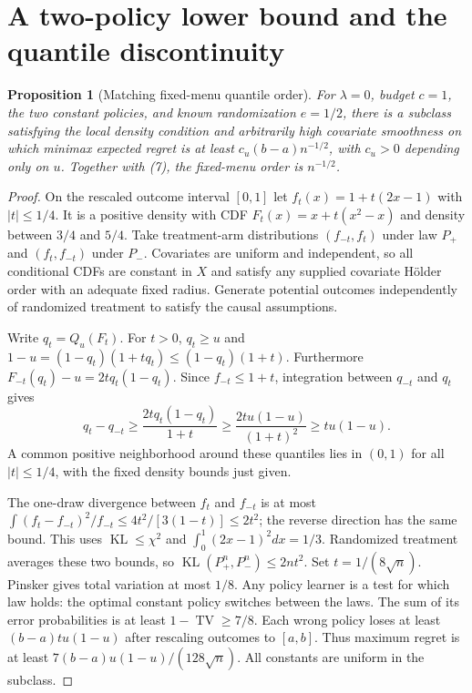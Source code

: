 \documentclass[11pt]{article}
\newtheorem{proposition}[theorem]{Proposition}
\theoremstyle{remark}
\newcommand{\TV}{\operatorname{TV}}
\newcommand{\KL}{\operatorname{KL}}
\begin{document}
\section{A two-policy lower bound and the quantile discontinuity}
\begin{proposition}[Matching fixed-menu quantile order]
For $\lambda=0$, budget $c=1$, the two constant policies, and known
randomization $e=1/2$, there is a subclass satisfying the local density
condition and arbitrarily high covariate smoothness on which minimax
expected regret is at least $c_u(b-a)n^{-1/2}$, with $c_u>0$ depending
only on $u$. Together with (7), the fixed-menu order is $n^{-1/2}$.
\end{proposition}
\begin{proof}
On the rescaled outcome interval $[0,1]$ let
$f_t(x)=1+t(2x-1)$ with $|t|\leq1/4$. It is a positive density with
CDF $F_t(x)=x+t(x^2-x)$ and density between $3/4$ and $5/4$.
Take treatment-arm distributions $(f_{-t},f_t)$ under law $P_+$ and
$(f_t,f_{-t})$ under $P_-$. Covariates are uniform and independent,
so all conditional CDFs are constant in $X$ and satisfy any supplied
covariate H\"older order with an adequate fixed radius. Generate potential
outcomes independently of randomized treatment to satisfy the causal
assumptions.

Write $q_t=Q_u(F_t)$. For $t>0$, $q_t\geq u$ and
$1-u=(1-q_t)(1+tq_t)\leq(1-q_t)(1+t)$.
Furthermore $F_{-t}(q_t)-u=2tq_t(1-q_t)$.
Since $f_{-t}\leq1+t$, integration between $q_{-t}$ and $q_t$ gives
\[
 q_t-q_{-t}\geq\frac{2tq_t(1-q_t)}{1+t}
 \geq\frac{2tu(1-u)}{(1+t)^2}\geq t u(1-u).
\]
A common positive neighborhood around these quantiles lies in $(0,1)$
for all $|t|\leq1/4$, with the fixed density bounds just given.

The one-draw divergence between $f_t$ and $f_{-t}$ is at most
$\int (f_t-f_{-t})^2/f_{-t}\leq4t^2/[3(1-t)]\leq2t^2$;
the reverse direction has the same bound. This uses $\KL\leq\chi^2$
and $\int_0^1(2x-1)^2dx=1/3$. Randomized treatment averages these
two bounds, so $\KL(P_+^n,P_-^n)\leq2nt^2$. Set $t=1/(8\sqrt n)$.
Pinsker gives total variation at most $1/8$.
Any policy learner is a test for which law holds: the optimal constant
policy switches between the laws. The sum of its error probabilities
is at least $1-\TV\geq7/8$. Each wrong policy loses at least
$(b-a)t u(1-u)$ after rescaling outcomes to $[a,b]$.
Thus maximum regret is at least
$7(b-a)u(1-u)/(128\sqrt n)$. All constants are uniform in the subclass.
\end{proof}
\end{document}
